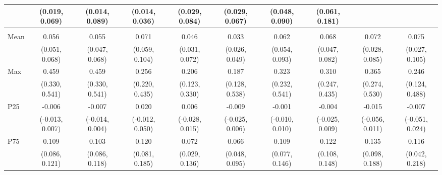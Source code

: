 {\begin{tabular}{l|c|c|c|c|c|c|c|c|c}
& {\scriptsize (0.019, 0.069)}
& {\scriptsize (0.014, 0.089)}
& {\scriptsize (0.014, 0.036)}
& {\scriptsize (0.029, 0.084)}
& {\scriptsize (0.029, 0.067)}
& {\scriptsize (0.048, 0.090)}
& {\scriptsize (0.061, 0.181)}
\\ [0.1cm]
\hline
\noalign{\smallskip}
\multicolumn{10}{l}{\textbf{Effect with Leads and Lags}} \\
\noalign{\smallskip}
\hline
Mean
& 0.056 & 0.055 & 0.071 & 0.046 & 0.033 & 0.062 & 0.068 & 0.072 & 0.075 \\
& {\scriptsize (0.051, 0.068)}
& {\scriptsize (0.047, 0.068)}
& {\scriptsize (0.059, 0.104)}
& {\scriptsize (0.031, 0.072)}
& {\scriptsize (0.026, 0.049)}
& {\scriptsize (0.054, 0.093)}
& {\scriptsize (0.047, 0.082)}
& {\scriptsize (0.028, 0.085)}
& {\scriptsize (0.027, 0.105)}
\\ [0.1cm]
\hline
Max
& 0.459 & 0.459 & 0.256 & 0.206 & 0.187 & 0.323 & 0.310 & 0.365 & 0.246 \\
& {\scriptsize (0.330, 0.541)}
& {\scriptsize (0.330, 0.541)}
& {\scriptsize (0.220, 0.435)}
& {\scriptsize (0.123, 0.330)}
& {\scriptsize (0.128, 0.538)}
& {\scriptsize (0.232, 0.541)}
& {\scriptsize (0.247, 0.435)}
& {\scriptsize (0.274, 0.530)}
& {\scriptsize (0.124, 0.488)}
\\ [0.1cm]
\hline
P25
& -0.006 & -0.007 & 0.020 & 0.006 & -0.009 & -0.001 & -0.004 & -0.015 & -0.007 \\
& {\scriptsize (-0.013, 0.007)}
& {\scriptsize (-0.014, 0.004)}
& {\scriptsize (-0.012, 0.050)}
& {\scriptsize (-0.028, 0.015)}
& {\scriptsize (-0.025, 0.006)}
& {\scriptsize (-0.010, 0.010)}
& {\scriptsize (-0.025, 0.009)}
& {\scriptsize (-0.056, 0.011)}
& {\scriptsize (-0.051, 0.024)}
\\ [0.1cm]
\hline
P75
& 0.109 & 0.103 & 0.120 & 0.072 & 0.066 & 0.109 & 0.122 & 0.135 & 0.116 \\
& {\scriptsize (0.086, 0.121)}
& {\scriptsize (0.086, 0.118)}
& {\scriptsize (0.081, 0.185)}
& {\scriptsize (0.029, 0.136)}
& {\scriptsize (0.048, 0.095)}
& {\scriptsize (0.077, 0.146)}
& {\scriptsize (0.108, 0.148)}
& {\scriptsize (0.098, 0.188)}
& {\scriptsize (0.042, 0.218)}
\\ [0.1cm]
\hline
\hline
\end{tabular}
}
